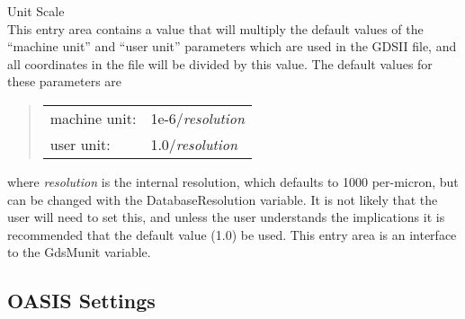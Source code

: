 \begin{description}
\item{\cb Unit Scale}\\
This entry area contains a value that will multiply the default values
of the ``machine unit'' and ``user unit'' parameters
which are used in the GDSII file, and all coordinates in the file will
be divided by this value.  The default values for these parameters
are
\begin{quote}
\begin{tabular}{ll}
machine unit: & 1e-6/{\it resolution}\\
user unit: & 1.0/{\it resolution}\\
\end{tabular}
\end{quote}
where {\it resolution} is the internal resolution, which defaults to
1000 per-micron, but can be changed with the {\et DatabaseResolution}
variable.  It is not likely that the user will need to set this, and
unless the user understands the implications it is recommended that
the default value (1.0) be used.  This entry area is an interface to
the {\et GdsMunit} variable.

\end{description}

\subsection{OASIS Settings}

